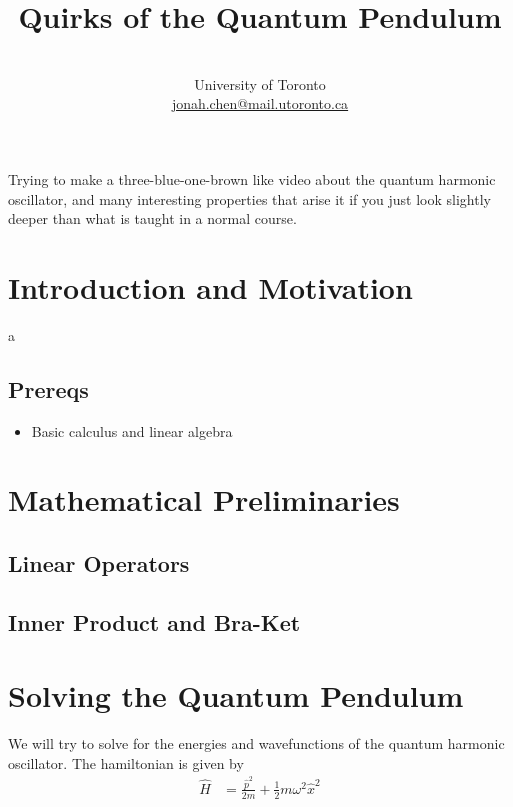 \documentclass[a4paper]{article}
\title{\vspace{-50pt}\bfseries{\Large{Quirks of the Quantum Pendulum}}\vspace{-5pt}}
\author{\normalfont{Jonah Chen}\\\vspace{-3pt}\small{University of Toronto}\\
\vspace{-10pt}\small{\url{jonah.chen@mail.utoronto.ca}}}
\date{}
\numberwithin{equation}{section}
\begin{document}
\maketitle
\sffamily

Trying to make a three-blue-one-brown like video about the quantum harmonic oscillator, and many interesting properties that arise it if you just look slightly deeper than what is taught in a normal course.

\section{Introduction and Motivation}

\begin{script}
    a
\end{script}

\subsection{Prereqs}
\begin{itemize}
    \item Basic calculus and linear algebra
\end{itemize}

\section{Mathematical Preliminaries}

\subsection{Linear Operators}

\subsection{Inner Product and Bra-Ket}




\section{Solving the Quantum Pendulum}

We will try to solve for the energies and wavefunctions of the quantum harmonic oscillator. The hamiltonian is given by
\begin{align}
    \hat H&=\frac{\hat p^2}{2m}+\frac{1}{2}m\omega^2\hat x^2\label{qho_hamiltonian}
\end{align}
\end{document}

